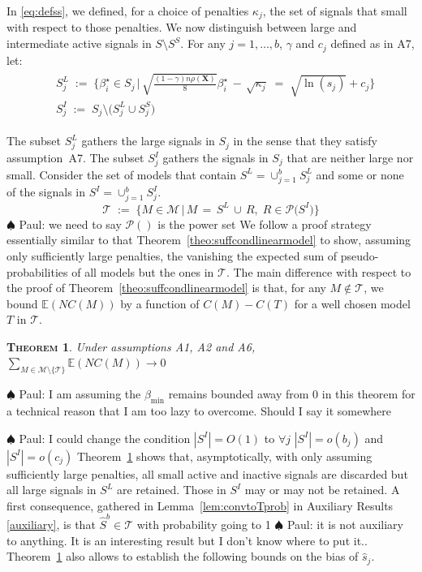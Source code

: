 \documentclass[aos]{imsart}
\theoremstyle{plain}
\newtheorem{thm}{\textsc{Theorem}}[section]
\newcommand{\paul}[1]{{\small{\color{green} \sf $\spadesuit$ Paul: #1}}}
\newcommand{\E}{\mathbb{E}}
\newcommand{\bs}{\boldsymbol}
\begin{document}
In \eqref{eq:defss}, we defined, for a choice of penalties $\kappa_j$, the set of signals that small with respect to those penalties. We now distinguish between large and intermediate active signals in $S \setminus S^S$. For any $j=1,\ldots,b$, $\gamma$ and $c_j$ defined as in A7, let: 
\begin{align}\label{eq:defslsi}
 \begin{split}
    &S_j^{L}\;:=\;\Bigg\{\beta_i^{\star} \in S_j \,\Big|\,\sqrt{\frac{(1-\gamma) n\rho(\bs X)}{8}}{\beta_{i}^{\star}} \,- \,\sqrt{\kappa_j} \;=\; \sqrt{\ln(s_j)} + c_{j}\Bigg\}\\
    &S_j^{I}\;:=\;S_j \setminus \big(S_j^L \cup S_j^S\big)
 \end{split}
\end{align}

The subset $S_j^{L}$ gathers the large signals in $S_j$ in the sense that they satisfy assumption~A7. The subset $S_j^{I}$ gathers the signals in $S_j$ that are neither large nor small. Consider the set of models that contain $S^L=\cup_{j=1}^b S^L_j$ and some or none of the signals in $S^I=\cup_{j=1}^b S^I_j$.
\begin{equation}
    \mathcal{T} \;:=\;\Big\{M \in \mathcal{M} \,\big|\, M\,=\, S^L\,\cup\,R,\; R\in \mathcal{P}\big(S^I\big)  \Big\}
\end{equation}
\paul{we need to say $ \mathcal{P}()$ is the power set}
We follow a proof strategy essentially similar to that Theorem~\ref{theo:suffcondlinearmodel} to show, assuming only sufficiently large penalties, the vanishing the expected sum of pseudo-probabilities of all models but the ones in $\mathcal{T}$. The main difference with respect to the proof of Theorem~\ref{theo:suffcondlinearmodel} is that, for any $M\not\in \mathcal{T}$, we bound $\E(NC(M))$ by a function of $C(M)-C(T)$ for a well chosen model $T$ in $\mathcal{T}$. 
\begin{thm}\label{thm:convtoT}
    Under assumptions A1, A2 and A6, $\sum_{M \in \mathcal{M}\setminus \{\mathcal{T}\}} \E\left(NC(M)\right)\to 0$
\end{thm}
\paul{I am assuming the $\beta_{\min}$ remains bounded away from 0 in this theorem for a technical reason that I am too lazy to overcome. Should I say it somewhere}

\paul{I could change the condition $|S^I|=O(1)$ to $\forall j$ $|S^I|=o(b_j)$ and $|S^I|=o(c_j)$ }
Theorem~\ref{thm:convtoT} shows that, asymptotically, with only assuming sufficiently large penalties, all small active and inactive signals are discarded but all large signals in $S^L$ are retained. Those in $S^I$ may or may not be retained. A first consequence, gathered in Lemma~\ref{lem:convtoTprob} in Auxiliary Results \ref{auxiliary}, is that $\hat{S}^b\in \mathcal{T}$ with probability going to 1 \paul{it is not auxiliary to anything. It is an interesting result but I don't know where to put it.}. Theorem~\ref{thm:convtoT} also allows to establish the following bounds on the bias of $\hat{s}_j$.
\end{document}

